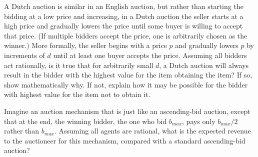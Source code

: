 
\begin{exercise}
A Dutch auction is similar in an English
auction, but rather than starting the bidding at a low price and
increasing, in a Dutch auction the seller starts at a high price
and gradually lowers the price until some buyer is willing to accept
that price. (If multiple bidders accept the price, one is
arbitrarily chosen as the winner.)  More formally, the seller begins
with a price \(p\) and gradually lowers \(p\) by increments of
\(d\) until at least one buyer accepts the price.  Assuming all bidders
act rationally, is it true that for arbitrarily small \(d\), a Dutch
auction will always result in the bidder with the highest value for
the item obtaining the item?  If so, show mathematically why.  If not,
explain how it may be possible for the bidder with highest value for
the item not to obtain it.
\end{exercise} 

\begin{exercise}
Imagine an auction mechanism that is just like an ascending-bid
auction, except that at the end, the winning bidder, the one who bid
\(b_{max}\), pays only \(b_{max}/2\) rather than \(b_{max}\). Assuming
all agents are rational, what is the expected revenue to the
auctioneer for this mechanism, compared with a standard ascending-bid auction?
\end{exercise} 

